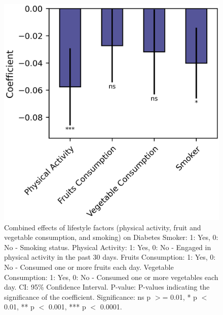 \documentclass[11pt]{article}
\begin{document}
\begin{codeoutput}
\begin{figure}[htbp]
\centering
\includegraphics{df_lifestyle_combined_formatted.png}
\caption{Combined effects of lifestyle factors (physical activity, fruit and vegetable consumption, and smoking) on Diabetes
Smoker: 1: Yes, 0: No - Smoking status. 
Physical Activity: 1: Yes, 0: No - Engaged in physical activity in the past 30 days. 
Fruits Consumption: 1: Yes, 0: No - Consumed one or more fruits each day. 
Vegetable Consumption: 1: Yes, 0: No - Consumed one or more vegetables each day. 
CI: 95\% Confidence Interval. 
P-value: P-values indicating the significance of the coefficient. 
Significance: ns p $>$= 0.01, * p $<$ 0.01, ** p $<$ 0.001, *** p $<$ 0.0001.}
\label{figure:df-lifestyle-combined-formatted}
\end{figure}
% 

\end{codeoutput}
\end{document}
